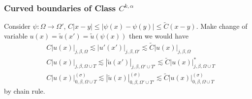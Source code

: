 \documentclass[12pt,a4paper]{article}
\begin{document}
\subsubsection*{Curved boundaries of Class $C^{k, \alpha}$}

Consider $\psi : \Omega \rightarrow \Omega'$, $C |x-y| \leq |\psi(x) - \psi(y)| \leq \tilde{C}(x-y)$. Make change of variable $u(x) = \tilde{u}(x')= \tilde{u}(\psi(x))$ then we would have
\begin{align*}
& C |u(x)|_{j, \beta, \Omega} \lesssim |u'(x')|_{j, \beta, \Omega'}\lesssim \tilde{C} |u(x)|_{j, \beta, \Omega} \\
& C |u(x)|_{j, \beta, \Omega\cup T} \lesssim |\tilde{u}(x')|_{j, \beta, \Omega'\cup T'} \lesssim \tilde{C} |u(x)|^*_{j, \beta, \Omega\cup T} \\
& C |u(x)|^{(\sigma)}_{0, \beta, \Omega\cup T} \lesssim |\tilde{u}(x)|^{(\sigma)}_{0, \beta, \Omega'\cup T'} \lesssim \tilde{C} |u(x)|^{(\sigma)}_{0, \beta, \Omega \cup T}
\end{align*}
by chain rule.
\s
\end{document}
